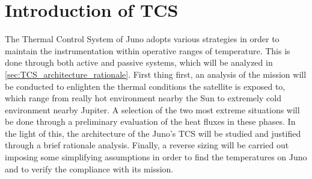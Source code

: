 \section{Introduction of TCS}
\label{sec:TCS_introduction}

The Thermal Control System of Juno adopts various strategies in order to maintain the instrumentation within operative ranges of temperature. This is done through both active and passive systems, which will be analyzed in \autoref{sec:TCS_architecture_rationale}.
First thing first, an analysis of the mission will be conducted to enlighten the thermal conditions the satellite is exposed to, which range from really hot environment nearby the Sun to extremely cold environment nearby Jupiter.
A selection of the two most extreme situations will be done through a preliminary evaluation of the heat fluxes in these phases.
In the light of this, the architecture of the Juno's TCS will be studied and justified through a brief rationale analysis.
Finally, a reverse sizing will be carried out imposing some simplifying assumptions in order to find the temperatures on Juno and to verify the compliance with its mission.

\begin{comment}
The Attitude and Orbital Control System of Juno comprehends various sensors and actuators that are vital to maintain the satellite in operability conditions and to execute all the basic tasks.
In this chapter, the main modes of the satellite are deduced through the analysis of the mission already done in previous chapters. These modes will be then arranged on the timeline consequently.
Based on the identified modes and pointing budget, the architecture of the actual system will be presented and then progressively analyzed, verifying the compliance with the previously found requirements.
Finally, a reverse sizing of AOCS will be carried out.
\end{comment}
